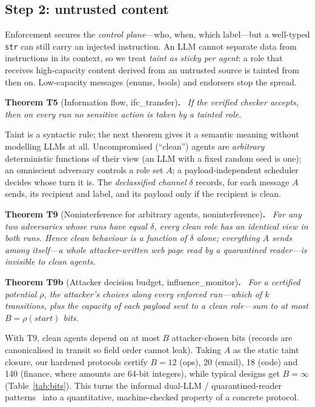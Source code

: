 \documentclass[10pt,twocolumn]{article}
\newenvironment{theorem}[2]{\par\smallskip\noindent\textbf{Theorem #1} (#2)\textbf{.}\ \itshape}{\par\smallskip}
\newcommand{\code}[1]{\texttt{\small #1}}
\newcommand{\thm}[1]{\textcolor{dk}{\textsf{\small #1}}}
\begin{document}
\subsection{Step 2: untrusted content}

Enforcement secures the \emph{control plane}---who, when, which label---but a well-typed \code{str} can still
carry an injected instruction. An LLM cannot separate data from instructions in its context, so we treat
\emph{taint as sticky per agent}: a role that receives high-capacity content derived from an untrusted source is
tainted from then on. Low-capacity messages (enums, bools) and endorsers stop the spread.

\begin{theorem}{T5}{Information flow, \thm{ifc\_transfer}}
If the verified checker accepts, then on every run no sensitive action is taken by a tainted role.
\end{theorem}

\noindent Taint is a syntactic rule; the next theorem gives it a semantic meaning without modelling LLMs at all.
Uncompromised (``clean'') agents are \emph{arbitrary} deterministic functions of their view (an LLM with a fixed
random seed is one); an omniscient adversary controls a role set $A$; a payload-independent scheduler decides
whose turn it is. The \emph{declassified channel} $\delta$ records, for each message $A$ sends, its recipient and
label, and its payload only if the recipient is clean.

\begin{theorem}{T9}{Noninterference for arbitrary agents, \thm{noninterference}}
For any two adversaries whose runs have equal $\delta$, every clean role has an identical view in both runs.
Hence clean behaviour is a function of $\delta$ alone; everything $A$ sends among itself---a whole attacker-written
web page read by a quarantined reader---is invisible to clean agents.
\end{theorem}

\begin{theorem}{T9b}{Attacker decision budget, \thm{influence\_monitor}}
For a certified potential $\rho$, the attacker's choices along every enforced run---which of $k$ transitions, plus
the capacity of each payload sent to a clean role---sum to at most $B=\rho(\mathit{start})$ bits.
\end{theorem}

\noindent With T9, clean agents depend on at most $B$ attacker-chosen bits (records are canonicalised in
transit so field order cannot leak). Taking $A$ as the static taint closure, our hardened protocols certify
$B=12$ (ops), 20 (email), 18 (code) and 140 (finance, where amounts are 64-bit integers), while typical designs get
$B=\infty$ (Table~\ref{tab:bits}). This turns the informal dual-LLM / quarantined-reader
patterns~\cite{beurerkellner2025designpatterns,debenedetti2025camel} into a quantitative, machine-checked
property of a concrete protocol.
\end{document}
